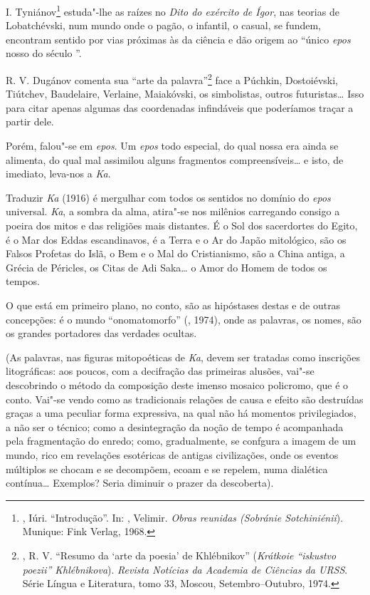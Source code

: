 I. Tyniánov\footnote{, Iúri. ``Introdução''. In: ,
  Velimir. \emph{Obras reunidas (Sobránie Sotchiniénii}).
  Munique: Fink Verlag, 1968.} estuda"-lhe as raízes no \emph{Dito do
exército de Ígor}, nas teorias de Lobatchévski, num mundo onde o pagão,
o infantil, o casual, se fundem, encontram sentido por vias próximas às
da ciência e dão origem ao ``único \emph{epos} nosso do século ''.

R. V. Dugánov comenta sua ``arte da palavra''\footnote{, R. V.
  ``Resumo da `arte da poesia' de Khlébnikov'' (\emph{Krátkoie ``iskustvo
  poezii'' Khlébnikova}). \emph{Revista Notícias da Academia de Ciências
  da URSS}. Série Língua e Literatura, tomo 33, Moscou,
  Setembro--Outubro, 1974.} face a Púchkin, Dostoiévski, Tiútchev,
Baudelaire, Verlaine, Maiakóvski, os simbolistas, outros futuristas\ldots{}
Isso para citar apenas algumas das coordenadas infindáveis que
poderíamos traçar a partir dele.

Porém, falou"-se em \emph{epos}. Um \emph{epos} todo especial, do qual
nossa era ainda se alimenta, do qual mal assimilou alguns fragmentos
compreensíveis\ldots{} e isto, de imediato, leva-nos a \emph{Ka}.

Traduzir \emph{Ka} (1916) é mergulhar com todos os sentidos no domínio
do \emph{epos} universal. \emph{Ka}, a sombra da alma, atira"-se nos
milênios carregando consigo a poeira dos mitos e das religiões mais
distantes. É o Sol dos sacerdortes do Egito, é o Mar dos Eddas
escandinavos, é a Terra e o Ar do Japão mitológico, são os Falsos
Profetas do Islã, o Bem e o Mal do Cristianismo, são a China antiga, a
Grécia de Péricles, os Citas de Adi Saka\ldots{} o Amor do Homem de todos os
tempos.

O que está em primeiro plano, no conto, são as hipóstases destas e de
outras concepções: é o mundo ``onomatomorfo'' (, 1974), onde as
palavras, os nomes, são os grandes portadores das verdades ocultas.

(As palavras, nas figuras mitopoéticas de \emph{Ka}, devem ser tratadas
como inscrições litográficas: aos poucos, com a decifração das primeiras
alusões, vai"-se descobrindo o método da composição deste imenso mosaico
policromo, que é o conto. Vai"-se vendo como as tradicionais relações de
causa e efeito são destruídas graças a uma peculiar forma expressiva, na
qual não há momentos privilegiados, a não ser o técnico; como a
desintegração da noção de tempo é acompanhada pela fragmentação do
enredo; como, gradualmente, se confgura a imagem de um mundo, rico em
revelações esotéricas de antigas civilizações, onde os eventos múltiplos
se chocam e se decompõem, ecoam e se repelem, numa dialética contínua\ldots{}
Exemplos? Seria diminuir o prazer da descoberta).

